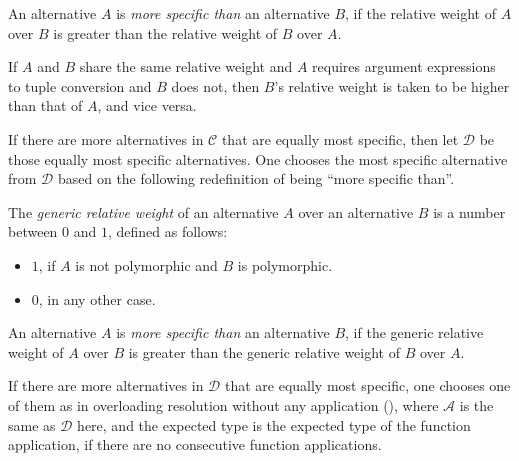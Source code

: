 An alternative $A$ is {\em more specific than} an alternative $B$, if the relative weight of $A$ over $B$ is greater than the relative weight of $B$ over $A$. 

If $A$ and $B$ share the same relative weight and $A$ requires argument expressions to tuple conversion and $B$ does not, then $B$'s relative weight is taken to be higher than that of $A$, and vice versa. 

If there are more alternatives in $\mathcal{C}$ that are equally most specific, then let $\mathcal{D}$ be those equally most specific alternatives. One chooses the most specific alternative from $\mathcal{D}$ based on the following redefinition of being ``more specific than''. 

\begin{definition}
The {\em generic relative weight} of an alternative $A$ over an alternative $B$ is a number between $0$ and $1$, defined as follows:
\begin{itemize}
  \item $1$, if $A$ is not polymorphic and $B$ is polymorphic. 
  \item $0$, in any other case. 
\end{itemize}
\end{definition}

An alternative $A$ is {\em more specific than} an alternative $B$, if the generic relative weight of $A$ over $B$ is greater than the generic relative weight of $B$ over $A$. 

If there are more alternatives in $\mathcal{D}$ that are equally most specific, one chooses one of them as in overloading resolution without any application (), where $\mathcal{A}$ is the same as $\mathcal{D}$ here, and the expected type is the expected type of the function application, if there are no consecutive function applications. 

